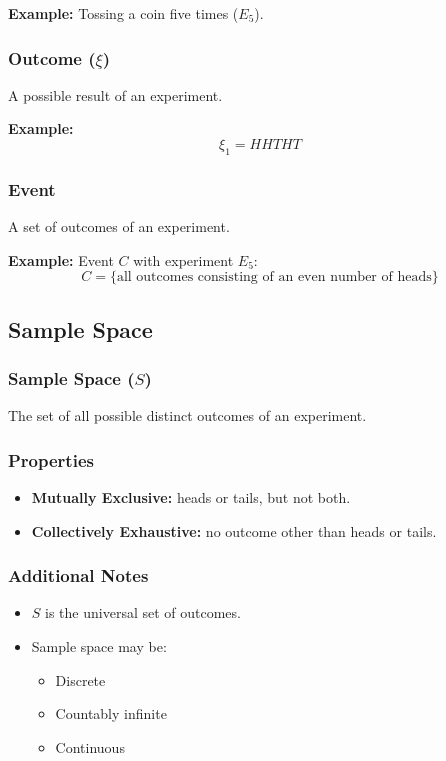 \documentclass[12pt]{article}
\begin{document}
\textbf{Example:} Tossing a coin five times ($E_5$).

\subsubsection*{Outcome ($\xi$)}
A possible result of an experiment.

\textbf{Example:}
\[
\xi_1 = HHTHT
\]

\subsubsection*{Event}
A set of outcomes of an experiment.

\textbf{Example:} Event $C$ with experiment $E_5$:
\[
C = \{\text{all outcomes consisting of an even number of heads}\}
\]

\subsection{Sample Space}

\subsubsection*{Sample Space ($S$)}
The set of all possible distinct outcomes of an experiment.

\subsubsection*{Properties}

\begin{itemize}
\item \textbf{Mutually Exclusive:} heads or tails, but not both.
\item \textbf{Collectively Exhaustive:} no outcome other than heads or tails.
\end{itemize}

\subsubsection*{Additional Notes}

\begin{itemize}
\item $S$ is the universal set of outcomes.
\item Sample space may be:
\begin{itemize}
\item Discrete
\item Countably infinite
\item Continuous
\end{itemize}
\end{itemize}
\end{document}
